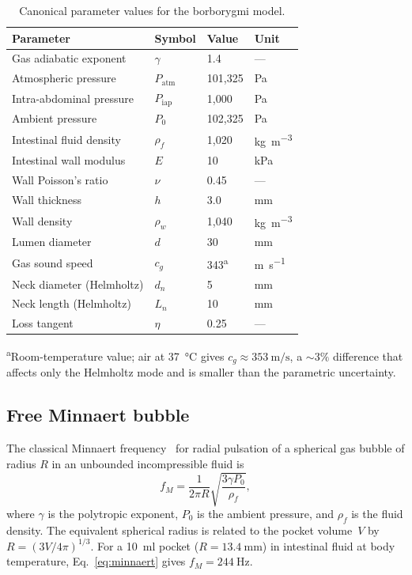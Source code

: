 \documentclass[review]{elsarticle}
\begin{document}
\begin{table}[t]
\centering
\caption{Canonical parameter values for the borborygmi model.}
\label{tab:params}
\begin{tabular}{llll}
\toprule
Parameter & Symbol & Value & Unit \\
\midrule
Gas adiabatic exponent & $\gamma$ & 1.4 & --- \\
Atmospheric pressure & $P_\mathrm{atm}$ & 101,325 & \si{\pascal} \\
Intra-abdominal pressure & $P_\mathrm{iap}$ & 1,000 & \si{\pascal} \\
Ambient pressure & $P_0$ & 102,325 & \si{\pascal} \\
Intestinal fluid density & $\rho_f$ & 1,020 & \si{\kilogram\per\metre\cubed} \\
Intestinal wall modulus & $E$ & 10 & \si{\kilo\pascal} \\
Wall Poisson's ratio & $\nu$ & 0.45 & --- \\
Wall thickness & $h$ & 3.0 & \si{\milli\metre} \\
Wall density & $\rho_w$ & 1,040 & \si{\kilogram\per\metre\cubed} \\
Lumen diameter & $d$ & 30 & \si{\milli\metre} \\
Gas sound speed & $c_g$ & 343\textsuperscript{a} & \si{\metre\per\second} \\
Neck diameter (Helmholtz) & $d_n$ & 5 & \si{\milli\metre} \\
Neck length (Helmholtz) & $L_n$ & 10 & \si{\milli\metre} \\
Loss tangent & $\eta$ & 0.25 & --- \\
\bottomrule
\end{tabular}
\par\smallskip
\textsuperscript{a}Room-temperature value; air at \SI{37}{\degreeCelsius} gives
$c_g \approx \SI{353}{\metre\per\second}$, a ${\sim}3\%$ difference that
affects only the Helmholtz mode and is smaller than the parametric uncertainty.
\end{table}

\subsection{Free Minnaert bubble}
\label{sec:minnaert}

The classical Minnaert frequency~\cite{Minnaert1933} for radial pulsation of
a spherical gas bubble of radius $R$ in an unbounded incompressible fluid is
\begin{equation}
  f_M = \frac{1}{2\pi R}\sqrt{\frac{3\gamma P_0}{\rho_f}},
  \label{eq:minnaert}
\end{equation}
where $\gamma$ is the polytropic exponent, $P_0$ is the ambient pressure, and
$\rho_f$ is the fluid density.  The equivalent spherical radius is related to
the pocket volume~$V$ by $R = (3V/4\pi)^{1/3}$.  For a
\SI{10}{\milli\litre} pocket ($R = \SI{13.4}{\milli\metre}$) in intestinal
fluid at body temperature, Eq.~\eqref{eq:minnaert} gives
$f_M = \SI{244}{\hertz}$.
\end{document}
